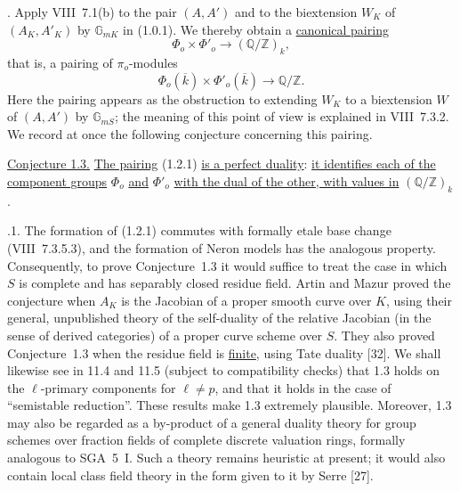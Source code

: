 
\medskip
{}. Apply VIII~7.1(b) to the pair $(A,A')$ and to the biextension
$W_K$ of $(A_K,A'_K)$ by $\mathbb G_{mK}$ in (1.0.1).  We thereby
obtain a \underline{canonical pairing}
\begin{equation}\tag{1.2.1}
 \Phi_o\times\Phi'_o\longrightarrow(\mathbb Q/\mathbb Z)_k,
\end{equation}
that is, a pairing of $\pi_o$-modules
\begin{equation}\tag{1.2.2}
 \Phi_o(\overline k)\times\Phi'_o(\overline k)
 \longrightarrow\mathbb Q/\mathbb Z.
\end{equation}
Here the pairing appears as the obstruction to extending $W_K$ to a
biextension $W$ of $(A,A')$ by $\mathbb G_{mS}$; the meaning of this
point of view is explained in VIII~7.3.2.  We record at once the
following conjecture concerning this pairing.

\medskip
\noindent
\underline{Conjecture 1.3.} \underline{The pairing} (1.2.1)
\underline{is a perfect duality}: \underline{it identifies each of the
component groups} $\Phi_o$ \underline{and} $\Phi'_o$
\underline{with the dual of the other, with values in}
$(\mathbb Q/\mathbb Z)_k$.

\medskip
{}.1. The formation of (1.2.1) commutes with formally etale base
change (VIII~7.3.5.3), and the formation of Neron models has the
analogous property.  Consequently, to prove Conjecture~1.3 it would
suffice to treat the case in which $S$ is complete and has separably
closed residue field.  Artin and Mazur proved the conjecture when
$A_K$ is the Jacobian of a proper smooth curve over $K$, using their
general, unpublished theory of the self-duality of the relative
Jacobian (in the sense of derived categories) of a proper curve scheme
over $S$.  They also proved Conjecture~1.3 when the residue field is
\underline{finite}, using Tate duality [32].  We shall likewise see in
11.4 and 11.5 (subject to compatibility checks) that 1.3 holds on the
$\ell$-primary components for $\ell\ne p$, and that it holds in the
case of ``semistable reduction''.  These results make 1.3 extremely
plausible.  Moreover, 1.3 may also be regarded as a by-product of a
general duality theory for group schemes over fraction fields of
complete discrete valuation rings, formally analogous to SGA~5~I.
Such a theory remains heuristic at present; it would also contain
local class field theory in the form given to it by Serre [27].

